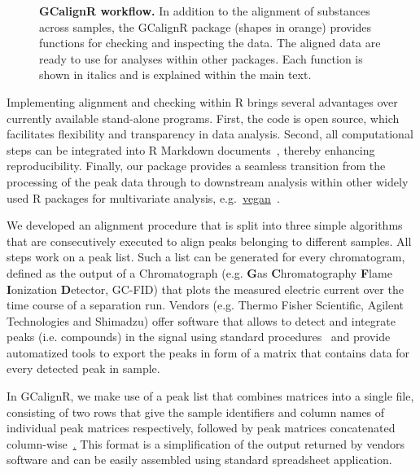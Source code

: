 \documentclass[10pt,letterpaper]{article}
\begin{document}
\begin{figure}[htbp]
\centering
\caption{\textbf{GCalignR workflow.}
In addition to the alignment of substances across samples, the GCalignR package (shapes in orange) provides functions for checking and inspecting the data. The aligned data are ready to use for analyses within other packages. Each function is shown in italics and is explained within the main text.}
\label{Fig:Fig1}
\end{figure}

Implementing  alignment and checking within R brings several advantages over currently available stand-alone programs. First, the code is open source, which facilitates flexibility and transparency in data analysis. Second, all computational steps can be integrated into R Markdown documents~\cite{Allaire.2016}, thereby enhancing reproducibility. Finally, our package provides a seamless transition from the processing of the peak data through to downstream analysis within other widely used R packages for multivariate analysis, e.g.~\href{https://CRAN.R-project.org/package=vegan}{vegan}~\cite{Oksanen.2016}.  

We developed an alignment procedure that is split into three simple algorithms that are consecutively executed to align peaks belonging to different samples. All steps work on a peak list. Such a list can be generated for every chromatogram, defined as the output of a Chromatograph (e.g. \textbf{G}as \textbf{C}hromatography \textbf{F}lame \textbf{I}onization \textbf{D}etector, GC-FID) that plots the measured electric current over the time course of a separation run. Vendors (e.g. Thermo Fisher Scientific, Agilent Technologies and Shimadzu) offer software that allows to detect and integrate peaks (i.e. compounds) in the signal using standard procedures~\cite{Grob.2004, McNair.2011} and provide automatized tools to export the peaks in form of a matrix that contains data for every detected peak in sample. \par
In GCalignR, we make use of a peak list that combines matrices into a single file, consisting of two rows that give the sample identifiers and column names of individual peak matrices respectively, followed by peak matrices concatenated column-wise~\href{Fig:Fig1B}. This format is a simplification of the output returned by vendors software and can be easily assembled using standard spreadsheet application.
\end{document}
